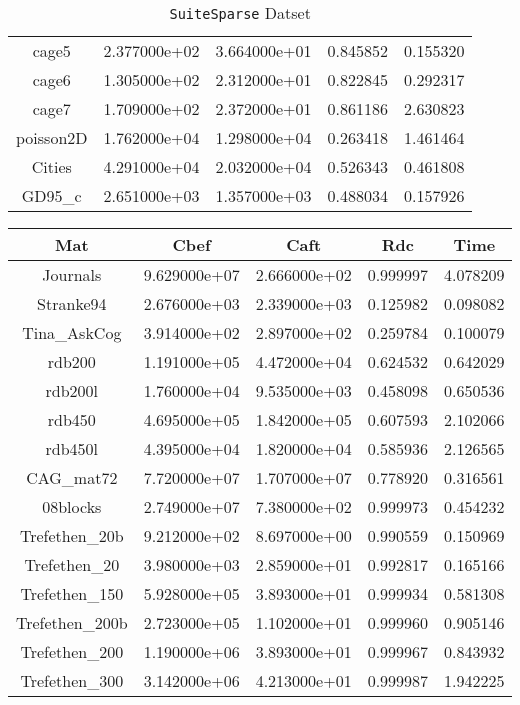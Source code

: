 \begin{table}[h]
\begin{tabular}{ccccc}
    cage5 & 2.377000e+02 & 3.664000e+01 & 0.845852 & 0.155320\\
    cage6 & 1.305000e+02 & 2.312000e+01 & 0.822845 & 0.292317\\
    cage7 & 1.709000e+02 & 2.372000e+01 & 0.861186 & 2.630823\\
    poisson2D & 1.762000e+04 & 1.298000e+04 & 0.263418 & 1.461464\\
    Cities & 4.291000e+04 & 2.032000e+04 & 0.526343 & 0.461808\\
    GD95\_c & 2.651000e+03 & 1.357000e+03 & 0.488034 & 0.157926\\
    \hline
  \end{tabular}
  \caption{\texttt{SuiteSparse} Datset}
\end{table}

\begin{table}[h]
  \begin{tabular}{ccccc}
    \hline
    Mat & Cbef & Caft & Rdc & Time\\
    \hline
    Journals & 9.629000e+07 & 2.666000e+02 & 0.999997 & 4.078209\\
    Stranke94 & 2.676000e+03 & 2.339000e+03 & 0.125982 & 0.098082\\
    Tina\_AskCog & 3.914000e+02 & 2.897000e+02 & 0.259784 & 0.100079\\
    rdb200 & 1.191000e+05 & 4.472000e+04 & 0.624532 & 0.642029\\
    rdb200l & 1.760000e+04 & 9.535000e+03 & 0.458098 & 0.650536\\
    rdb450 & 4.695000e+05 & 1.842000e+05 & 0.607593 & 2.102066\\
    rdb450l & 4.395000e+04 & 1.820000e+04 & 0.585936 & 2.126565\\
    CAG\_mat72 & 7.720000e+07 & 1.707000e+07 & 0.778920 & 0.316561\\
    08blocks & 2.749000e+07 & 7.380000e+02 & 0.999973 & 0.454232\\
    Trefethen\_20b & 9.212000e+02 & 8.697000e+00 & 0.990559 & 0.150969\\
    Trefethen\_20 & 3.980000e+03 & 2.859000e+01 & 0.992817 & 0.165166\\
    Trefethen\_150 & 5.928000e+05 & 3.893000e+01 & 0.999934 & 0.581308\\
    Trefethen\_200b & 2.723000e+05 & 1.102000e+01 & 0.999960 & 0.905146\\
    Trefethen\_200 & 1.190000e+06 & 3.893000e+01 & 0.999967 & 0.843932\\
    Trefethen\_300 & 3.142000e+06 & 4.213000e+01 & 0.999987 & 1.942225\\

\end{tabular}
\end{table}
